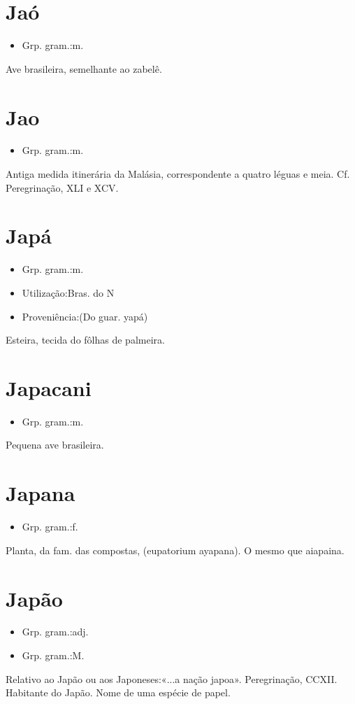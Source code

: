 \documentclass{article}
\begin{document}
\section{Jaó}
\begin{itemize}
\item {Grp. gram.:m.}
\end{itemize}
Ave brasileira, semelhante ao zabelê.
\section{Jao}
\begin{itemize}
\item {Grp. gram.:m.}
\end{itemize}
Antiga medida itinerária da Malásia, correspondente a quatro léguas e meia. Cf. \textunderscore Peregrinação\textunderscore , XLI e XCV.
\section{Japá}
\begin{itemize}
\item {Grp. gram.:m.}
\end{itemize}
\begin{itemize}
\item {Utilização:Bras. do N}
\end{itemize}
\begin{itemize}
\item {Proveniência:(Do guar. \textunderscore yapá\textunderscore )}
\end{itemize}
Esteira, tecida do fôlhas de palmeira.
\section{Japacani}
\begin{itemize}
\item {Grp. gram.:m.}
\end{itemize}
Pequena ave brasileira.
\section{Japana}
\begin{itemize}
\item {Grp. gram.:f.}
\end{itemize}
Planta, da fam. das compostas, (\textunderscore eupatorium ayapana\textunderscore ).
O mesmo que \textunderscore aiapaina\textunderscore .
\section{Japão}
\begin{itemize}
\item {Grp. gram.:adj.}
\end{itemize}
\begin{itemize}
\item {Grp. gram.:M.}
\end{itemize}
Relativo ao Japão ou aos Japoneses:«\textunderscore ...a nação japoa\textunderscore ». \textunderscore Peregrinação\textunderscore , CCXII.
Habitante do Japão.
Nome de uma espécie de papel.
\end{document}
